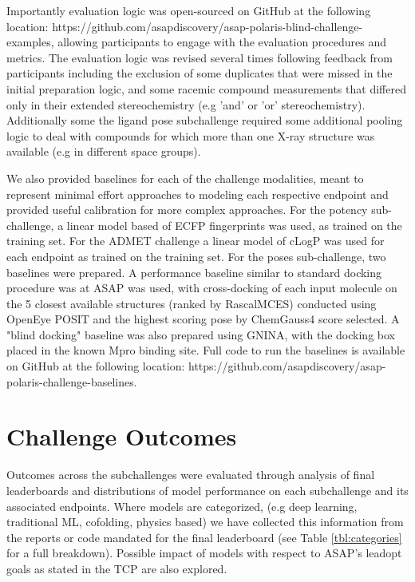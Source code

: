 \documentclass[journal=jcim,manuscript=article]{achemso}
\begin{document}
Importantly evaluation logic was open-sourced on GitHub at the following location: https://github.com/asapdiscovery/asap-polaris-blind-challenge-examples, allowing participants to engage with the evaluation procedures and metrics. The evaluation logic was revised several times following feedback from participants including the exclusion of some duplicates that were missed in the initial preparation logic, and some racemic compound measurements that differed only in their extended stereochemistry (e.g 'and' or 'or' stereochemistry). Additionally some the ligand pose subchallenge required some additional pooling logic to deal with compounds for which more than one X-ray structure was available (e.g in different space groups). 


We also provided baselines for each of the challenge modalities, meant to represent minimal effort approaches to modeling each respective endpoint and provided useful calibration for more complex approaches. For the potency sub-challenge, a linear model based of ECFP fingerprints was used, as trained on the training set. For the ADMET challenge a linear model of cLogP was used for each endpoint as trained on the training set. For the poses sub-challenge, two baselines were prepared. A performance baseline similar to standard docking procedure was at ASAP was used, with cross-docking of each input molecule on the 5 closest available structures (ranked by RascalMCES) conducted using OpenEye POSIT and the highest scoring pose by ChemGauss4 score selected. A "blind docking" baseline was also prepared using GNINA, with the docking box placed in the known Mpro binding site. Full code to run the baselines is available on GitHub at the following location: https://github.com/asapdiscovery/asap-polaris-challenge-baselines. 

\section{Challenge Outcomes}

Outcomes across the subchallenges were evaluated through analysis of final leaderboards and distributions of model performance on each subchallenge and its associated endpoints. Where models are categorized, (e.g deep learning, traditional ML, cofolding, physics based) we have collected this information from the reports or code mandated for the final leaderboard (see Table \ref{tbl:categories} for a full breakdown). Possible impact of models with respect to ASAP's leadopt goals as stated in the TCP\cite{sars_mers_tcp} are also explored. 
\end{document}
